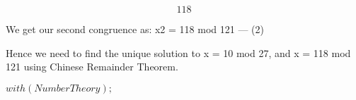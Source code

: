 \documentclass{article}
\begin{document}
\begin{dmath}\label{(8)}
118
\end{dmath}
\begin{Maple Normal}
We get our second congruence as: x2 = 118 mod 121 --- (2)
\end{Maple Normal}
\begin{Maple Normal}

\end{Maple Normal}
\begin{Maple Normal}
Hence  we need to find the unique solution to x = 10 mod 27, and x = 118 mod 121 using Chinese Remainder Theorem.
\end{Maple Normal}
\begin{Maple Normal}

\end{Maple Normal}
\mapleinput
{$ \displaystyle \mathit{with} (\mathit{NumberTheory}); $}
\end{document}
